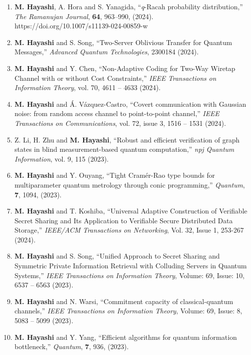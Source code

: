 \documentclass[a4paper,12pt,oneside]{article}
\begin{document}
\begin{enumerate}
\item
\textbf{M. Hayashi}, A. Hora and S. Yanagida,
``{\em q}-Racah probability distribution,''
{\em The Ramanujan Journal},
\textbf{64}, 963–990, (2024). 
https://doi.org/10.1007/s11139-024-00859-w

\item
\textbf{M. Hayashi} and S. Song,
``Two-Server Oblivious Transfer for Quantum Messages,''
{\em Advanced Quantum Technologies},
2300184 (2024).

\item
\textbf{M. Hayashi} and Y. Chen,
``Non-Adaptive Coding for Two-Way Wiretap Channel with or without Cost Constraints,''
{\em IEEE Transactions on Information Theory},
vol. 70, 4611 – 4633 (2024).

\item
\textbf{M. Hayashi} and \'{A}. V\'{a}zquez-Castro,
``Covert communication with Gaussian noise: from random access channel to point-to-point channel,''
{\em IEEE Transactions on Communications},
vol. 72, issue 3, 1516 – 1531 (2024).

\item
Z. Li, H. Zhu and \textbf{M. Hayashi},
``Robust and efficient verification of graph states in blind measurement-based quantum computation,''
{\em npj Quantum Information},
vol. 9, 115 (2023).

\item
\textbf{M. Hayashi} and Y. Ouyang,
``Tight Cramér-Rao type bounds for multiparameter quantum metrology through conic programming,''
{\em Quantum},
{\bf 7}, 1094, (2023).

\item
\textbf{M. Hayashi} and T. Koshiba,
``Universal Adaptive Construction of Verifiable Secret Sharing and Its Application to Verifiable Secure Distributed Data Storage,''
{\em IEEE/ACM Transactions on Networking}, 
Vol. 32, Issue 1, 253-267 (2024).

\item
\textbf{M. Hayashi} and S. Song,
``Unified Approach to Secret Sharing and Symmetric Private Information Retrieval with Colluding Servers in Quantum Systems,''
{\em IEEE Transactions on Information Theory},
Volume: 69, Issue: 10, 6537 – 6563 (2023).

\item
\textbf{M. Hayashi} and N. Warsi,
``Commitment capacity of classical-quantum channels,''
{\em IEEE Transactions on Information Theory},
Volume: 69, Issue: 8, 5083 – 5099 (2023).

\item
\textbf{M. Hayashi} and Y. Yang,
``Efficient algorithms for quantum information bottleneck,''
{\em Quantum},
{\bf 7}, 936, (2023).


\end{enumerate}
\end{document}
